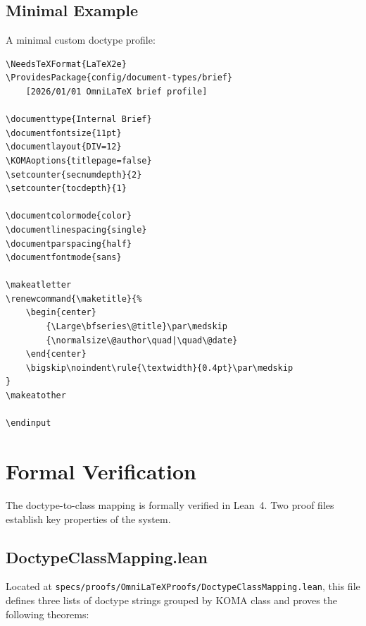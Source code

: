 \subsection{Minimal Example}

A minimal custom doctype profile:

\begin{verbatim}
\NeedsTeXFormat{LaTeX2e}
\ProvidesPackage{config/document-types/brief}
    [2026/01/01 OmniLaTeX brief profile]

\documenttype{Internal Brief}
\documentfontsize{11pt}
\documentlayout{DIV=12}
\KOMAoptions{titlepage=false}
\setcounter{secnumdepth}{2}
\setcounter{tocdepth}{1}

\documentcolormode{color}
\documentlinespacing{single}
\documentparspacing{half}
\documentfontmode{sans}

\makeatletter
\renewcommand{\maketitle}{%
    \begin{center}
        {\Large\bfseries\@title}\par\medskip
        {\normalsize\@author\quad|\quad\@date}
    \end{center}
    \bigskip\noindent\rule{\textwidth}{0.4pt}\par\medskip
}
\makeatother

\endinput
\end{verbatim}

\section{Formal Verification}

The doctype-to-class mapping is formally verified in Lean~4.  Two proof
files establish key properties of the system.

\subsection{DoctypeClassMapping.lean}

Located at \texttt{specs/proofs/OmniLaTeXProofs/DoctypeClassMapping.lean},
this file defines three lists of doctype strings grouped by KOMA class
and proves the following theorems:

